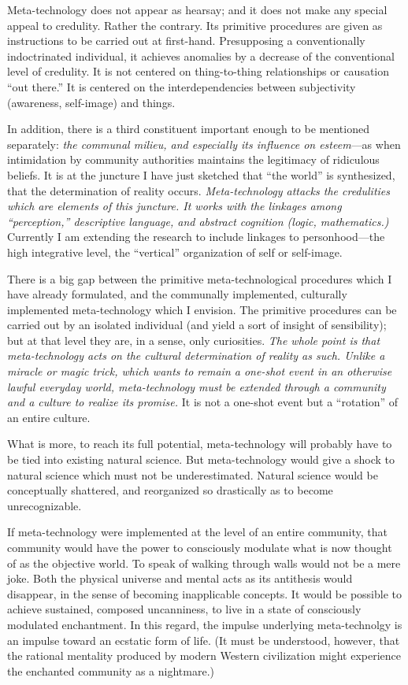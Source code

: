 Meta-technology does not appear as hearsay; and it does not make any special 
appeal to credulity. Rather the contrary. Its primitive procedures are given as 
instructions to be carried out at first-hand. Presupposing a conventionally 
indoctrinated individual, it achieves anomalies by a decrease of the conventional level of 
credulity. It is not centered on thing-to-thing relationships or causation \enquote{out there.} 
It is centered on the interdependencies between subjectivity (awareness, self-image) and things. 

In addition, there is a third constituent important enough to be mentioned 
separately: \textit{the communal milieu, and especially its influence on esteem}---as when 
intimidation by community authorities maintains the legitimacy of ridiculous 
beliefs. It is at the juncture I have just sketched that \enquote{the world} is synthesized, that 
the determination of reality occurs. \textit{Meta-technology attacks the credulities which are 
elements of this juncture. It works with the linkages among \enquote{perception,} descriptive 
language, and abstract cognition (logic, mathematics.)} Currently I am extending the 
research to include linkages to personhood---the high integrative level, the \enquote{vertical} 
organization of self or self-image. 

There is a big gap between the primitive meta-technological procedures which I 
have already formulated, and the communally implemented, culturally implemented 
meta-technology which I envision. The primitive procedures can be 
carried out by an isolated individual (and yield a sort of insight of sensibility); but at 
that level they are, in a sense, only curiosities. \textit{The whole point is that meta-technology 
acts on the cultural determination of reality as such. Unlike a miracle or magic trick, 
which wants to remain a one-shot event in an otherwise lawful everyday world, 
meta-technology must be extended through a community and a culture to realize its promise.} It 
is not a one-shot event but a \enquote{rotation} of an entire culture. 

What is more, to reach its full potential, meta-technology will probably have to be 
tied into existing natural science. But meta-technology would give a shock to 
natural science which must not be underestimated. Natural science would be conceptually 
shattered, and reorganized so drastically as to become unrecognizable. 

\visbreak

If meta-technology were implemented at the level of an entire community, that community would have the power to consciously modulate what is now thought of as the objective world. To speak of walking through walls would not be a mere joke. Both the physical universe and mental acts as its antithesis would disappear, in the sense of becoming inapplicable concepts. It would be possible to achieve sustained, composed uncanniness, to live in a state of consciously modulated enchantment. In this regard, the impulse underlying meta-technolgy is an impulse toward an ecstatic form of life. (It must be understood, however, that the rational mentality produced by modern Western civilization might experience the enchanted community as a nightmare.) 

